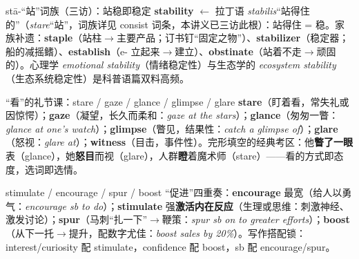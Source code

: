 \documentclass[../main.tex]{subfiles}
\begin{document}
\begin{gram}{stā-“站”词族（三访）：站稳即稳定}
\textbf{stability} $\leftarrow$ 拉丁语 \textit{stabilis}“站得住的”（\textit{stare}“站”，词族详见 consist 词条，本讲义已三访此根）：站得住 = 稳。家族补遗：\textbf{staple}（站柱$\to$主要产品；订书钉“固定之物”）、\textbf{stabilizer}（稳定器；船的减摇鳍）、\textbf{establish}（e- 立起来$\to$建立）、\textbf{obstinate}（站着不走$\to$顽固的）。心理学 \textit{emotional stability}（情绪稳定性）与生态学的 \textit{ecosystem stability}（生态系统稳定性）是科普语篇双料高频。
\end{gram}



\begin{gram}{“看”的礼节课：stare / gaze / glance / glimpse / glare}
\textbf{stare}（盯着看，常失礼或因惊愕）；\textbf{gaze}（凝望，长久而柔和：\textit{gaze at the stars}）；\textbf{glance}（匆匆一瞥：\textit{glance at one's watch}）；\textbf{glimpse}（瞥见，结果性：\textit{catch a glimpse of}）；\textbf{glare}（怒视：\textit{glare at}）；\textbf{witness}（目击，事件性）。完形填空的经典考区：他\textbf{瞥了一眼}表（glance），她\textbf{怒目}而视（glare），人群\textbf{瞪}着魔术师（stare）——看的方式即态度，选词即选情。
\end{gram}



\begin{gram}{stimulate / encourage / spur / boost}
“促进”四重奏：\textbf{encourage} 最宽（给人以勇气：\textit{encourage sb to do}）；\textbf{stimulate} 强\textbf{激活内在反应}（生理或思维：刺激神经、激发讨论）；\textbf{spur}（马刺“扎一下”$\to$鞭策：\textit{spur sb on to greater efforts}）；\textbf{boost}（从下一托$\to$提升，配数字尤佳：\textit{boost sales by 20\%}）。写作搭配锁：interest/curiosity 配 stimulate，confidence 配 boost，sb 配 encourage/spur。
\end{gram}
\end{document}
